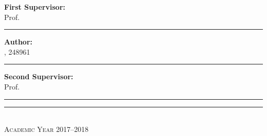 \begin{titlepage}
\vspace{.075\textheight}

\begin{minipage}[3cm]{.4\textwidth}
\textbf{First Supervisor:} \\ \smallskip
Prof. \myProf

\smallskip
\vspace{1cm}
\rule[0.4cm]{\textwidth}{1pt}
\end{minipage}
\hfill
\begin{minipage}[3cm]{.4\textwidth}
\textbf{Author:} \\ \smallskip
\myName, 248961

\smallskip
\vspace{1cm}
\rule[.4cm]{\textwidth}{1pt}
\end{minipage}

\vspace{.01\textheight}

\begin{minipage}[3cm]{.4\textwidth}
\textbf{Second Supervisor:} \\ \smallskip
Prof. \mySupervisor

\smallskip
\vspace{1cm}
\rule[.4cm]{\textwidth}{1pt}
\end{minipage}
\hfill

\begin{center}
\vfill
\rule{\textwidth}{1pt}\\
{\scshape Academic Year 2017--2018}


\end{center}
\end{titlepage}